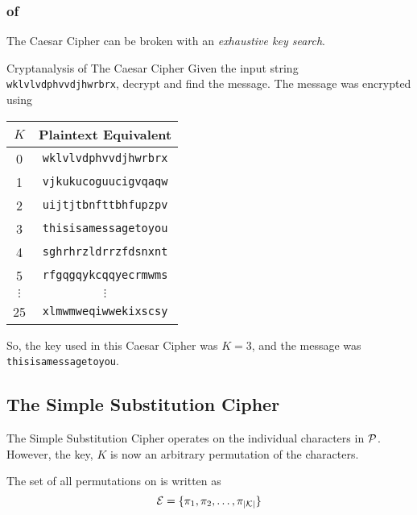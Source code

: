 \subsubsection{ of }\label{subsubsec:Cryptanalysis_Caesar_Cipher}
The Caesar Cipher can be broken with an \emph{exhaustive key search}.
\begin{example}[Lecture 4]{Cryptanalysis of The Caesar Cipher}
  Given the input string \texttt{wklvlvdphvvdjhwrbrx}, decrypt and find the message.
  The message was encrypted using 
  \tcblower{}
  \begin{center}
    \begin{tabular}{cc}
      \toprule
      $K$ & Plaintext Equivalent \\
      \midrule
      0 & \texttt{wklvlvdphvvdjhwrbrx} \\
      1 & \texttt{vjkukucoguucigvqaqw} \\
      2 & \texttt{uijtjtbnfttbhfupzpv} \\
      \midrule
      3 & \texttt{thisisamessagetoyou} \\
      \midrule
      4 & \texttt{sghrhrzldrrzfdsnxnt} \\
      5 & \texttt{rfgqgqykcqqyecrmwms} \\
      $\vdots$ & $\vdots$ \\
      25 & \texttt{xlmwmweqiwwekixscsy} \\
      \bottomrule
    \end{tabular}
  \end{center}

  So, the key used in this Caesar Cipher was $K=3$, and the message was \texttt{thisisamessagetoyou}.
\end{example}

\subsection{The Simple Substitution Cipher}\label{subsec:Simple_Substitution_Cipher}
The Simple Substitution Cipher operates on the individual characters in $\operatorname{\mathcal{P}}$.
However, the key, $K$ is now an arbitrary permutation of the characters.

The set of all permutations on  is written as
\begin{equation*}
  \operatorname{\mathcal{E}} = \lbrace \pi_{1}, \pi_{2}, \ldots, \pi_{\lvert \operatorname{\mathcal{K}} \rvert} \rbrace
\end{equation*}


